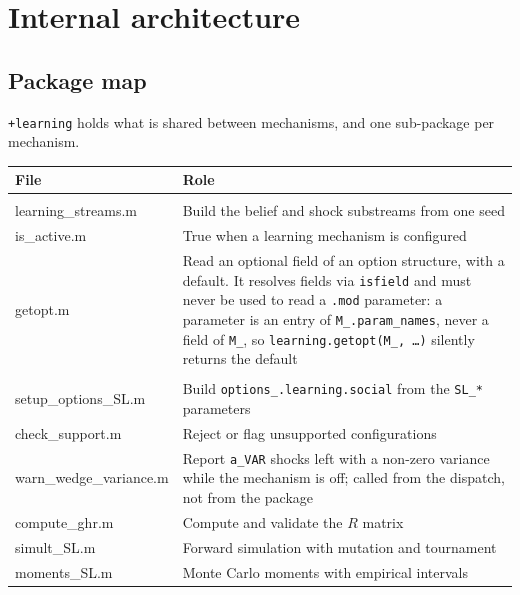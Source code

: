 \documentclass[11pt,a4paper]{article}
\newcommand{\field}[1]{\texttt{#1}}
\newcommand{\file}[1]{\texttt{#1}}
\begin{document}
\appendix

\section{Internal architecture}
\label{app:architecture}

\subsection{Package map}
\label{app:architecture:map}

\file{+learning} holds what is shared between mechanisms, and one sub-package
per mechanism.

\begin{longtable}{>{\ttfamily\small}p{5.5cm} p{8.5cm}}
\toprule
\normalfont\textbf{File} & \textbf{Role} \\
\midrule
\endhead
\multicolumn{2}{l}{\normalfont\textit{+learning}} \\
\midrule
learning\_streams.m & Build the belief and shock substreams from one seed \\
is\_active.m        & True when a learning mechanism is configured \\
getopt.m            & Read an optional field of an option structure, with a default. It resolves fields via \texttt{isfield} and must never be used to read a \file{.mod} parameter: a parameter is an entry of \field{M\_.param\_names}, never a field of \field{M\_}, so \texttt{learning.getopt(M\_, \ldots)} silently returns the default \\
\midrule
\multicolumn{2}{l}{\normalfont\textit{+learning/+social --- simulation}} \\
\midrule
setup\_options\_SL.m & Build \field{options\_.learning.social} from the \texttt{SL\_*} parameters \\
check\_support.m     & Reject or flag unsupported configurations \\
warn\_wedge\_variance.m & Report \texttt{a\_VAR} shocks left with a non-zero variance while the mechanism is off; called from the dispatch, not from the package \\
compute\_ghr.m       & Compute and validate the $R$ matrix \\
simult\_SL.m         & Forward simulation with mutation and tournament \\
moments\_SL.m        & Monte Carlo moments with empirical intervals \\

\end{longtable}
\end{document}
